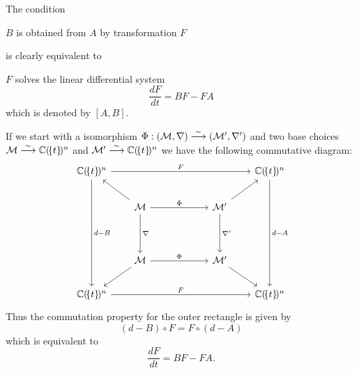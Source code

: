 \begin{rem}
  The condition
  \begin{einr}
    $B$ is obtained from $A$ by transformation $F$
  \end{einr}
  is clearly equivalent to
  \begin{einr}
    $F$ solves the linear differential system
    \[
      \frac{dF}{dt}=BF-FA
    \]
    which is denoted by $[A,B]$.
  \end{einr}
  \begin{s-rem}
    If we start with a isomorphism
    $\Phi:(\mathcal{M},\nabla)\overset{\sim}\longrightarrow(\mathcal{M}',\nabla')$ and two
    base choices $\mathcal{M}\overset{\sim}\longrightarrow\mathbb{C}(\!\{t\}\!)^n$ and
    $\mathcal{M}'\overset{\sim}\longrightarrow\mathbb{C}(\!\{t\}\!)^n$ we have the following
    commutative diagram:
    \[ \begin{tikzcd}[column sep=.7cm,row sep=.7cm]
        \C(\!\{t\}\!)^n \arrow{rrrrr}{F}\arrow{dddd}{d-B}&&&&&
          \C(\!\{t\}\!)^n\arrow{dddd}{d-A}
          \\ & \cM \arrow{dd}{\nabla}\arrow{rrr}{\Phi}\ular&&& \cM'\arrow{dd}{\nabla'}\urar
          \\
        \\ & \cM \arrow{rrr}{\Phi}\dlar&&& \cM'\drar
        \\ \C(\!\{t\}\!)^n \arrow{rrrrr}{F}&&&&& \C(\!\{t\}\!)^n
    \end{tikzcd} \]
    Thus the commutation property for the outer rectangle is given by
    \[
      (d-B)\circ F=F\circ(d-A)
    \]
    which is equivalent \TODO[really] to
    \[
      \frac{dF}{dt}=BF-FA.
    \]
    \begin{comment}
      \begin{align*}
        ((d-B)\circ F) x &= (F\circ(d-A)) x
      \\(d\circ F) x - (B\circ F) x &= F(dx -Ax)
      \\d(Fx) - B(Fx) &= F(x' - Ax)
      \\(F'x)x' - BFx &= Fx' - FAx
      \\(F'x)x' - Fx' &= BFx - FAx
      \\(F'x)x' - Fx' &= (BF - FA)x
      \\&~\!~\vdots
      \\F'x &= (BF - FA)x
      \end{align*}
    \end{comment}
  \end{s-rem}
\end{rem}
